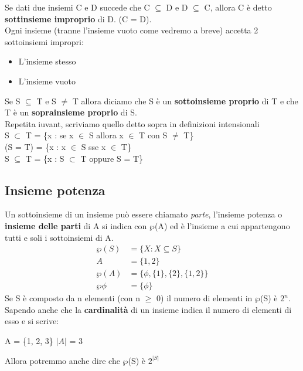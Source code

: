 Se dati due insiemi C e D succede che C $\subseteq$ D e D $\subseteq$ C,
allora C è detto \textbf{sottinsieme improprio} di D. (C = D).\\
Ogni insieme (tranne l'insieme vuoto come vedremo a breve) accetta 2 sottoinsiemi impropri:
\begin{itemize}
    \item L'insieme stesso
    \item L'insieme vuoto
\end{itemize}
Se S $\subseteq$ T e S $\neq$ T allora diciamo che S è un \textbf{sottoinsieme proprio} di T
e che T è un \textbf{soprainsieme proprio} di S. \\
Repetita iuvant, scriviamo quello detto sopra in definizioni intensionali \\
S $\subset$ T = \{x : se x $\in$ S allora x $\in$ T con S $\neq$ T\} \\
(S = T) = \{x : x $\in$ S sse x $\in$ T\} \\
S $\subseteq$ T = \{x : S $\subset$ T oppure S = T\} \\

\subsection{Insieme potenza}
Un sottoinsieme di un insieme può essere chiamato \textit{parte}, l'insieme potenza
o \textbf{insieme delle parti} di A si indica con $\wp$(A) ed è l'insieme a cui appartengono tutti e soli i sottoinsiemi di A. \\
\begin{align*}
    \wp(S) &= \{X : X \subseteq S\} \\
    A &= \{1, 2\} \\
    \wp(A) &= \{\phi, \{1\}, \{2\}, \{1, 2\}\} \\
    \wp\phi &= \{\phi\}
\end{align*}
Se S è composto da n elementi (con n $\geq$ 0) il numero di elementi in $\wp$(S) è $2^n$.
Sapendo anche che la \textbf{cardinalità} di un insieme indica il numero di elementi di esso e si scrive:
\begin{center}
    A = \{1, 2, 3\} $|A|$ = 3
\end{center}
Allora potremmo anche dire che $\wp$(S) è $2^{|S|}$